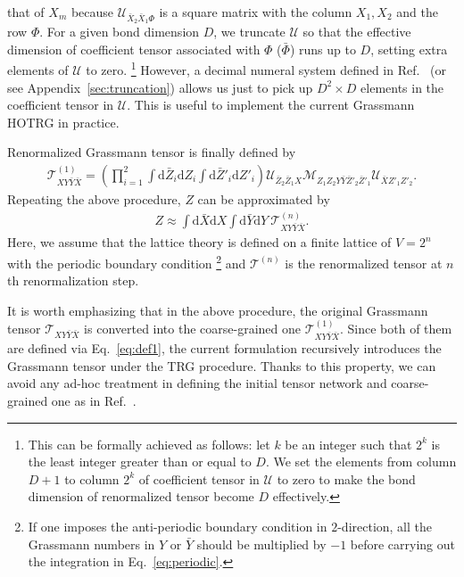 \documentclass[a4paper,11pt]{article}
\newcommand{\diff}{\mathrm{d}}
\begin{document}
that of $X_m$ because $\mathcal{U}_{\bar X_2\bar X_1\Phi}$ is a square matrix with the column $X_1,X_2$
and the row $\Phi$. 
For a given bond dimension $D$, we truncate $\mathcal{U}$  so that the effective dimension of coefficient tensor associated with $\Phi$ ($\bar \Phi$) runs up to $D$, setting extra elements of $\mathcal{U}$ to zero. 
\footnote{
This can be formally achieved as follows: 
let $k$ be an integer such that $2^{k}$ is the least integer greater than 
or equal to $D$.  
We set the elements from column $D+1$ to column $2^{k}$ of coefficient tensor in $\mathcal{U}$  to zero 
to make the bond dimension of renormalized tensor become $D$ effectively.
}
However, a decimal numeral system defined in
 Ref.~\cite{Kadoh} (or see Appendix~\ref{sec:truncation}) allows us just 
to pick up $D^{2}\times D$ elements in the coefficient tensor in $\mathcal{U}$. 
This is useful to implement the current Grassmann HOTRG in practice. 


Renormalized Grassmann tensor is finally defined by 
\begin{align}
	\mathcal{T}^{(1)}_{X Y\bar{Y}\bar{X}}=\left(\prod_{i=1}^{2}
	\int\diff\bar{Z}_{i} \diff{Z_{i}}  
       \int\diff\bar{Z}'_{i}\diff{Z'_{i}} 
       \right)
\mathcal{U}_{\bar{Z}_{2}\bar{Z}_{1}X}
\mathcal{M}_{Z_{1}Z_{2}Y\bar{Y}\bar{Z}'_{2}\bar{Z}'_{1}}\mathcal{U}_{\bar{X}Z'_{1}Z'_{2}}.
\end{align}
Repeating the above procedure, $Z$ can be approximated by 
\begin{align}
\label{eq:periodic}
	Z \approx \int\diff\bar{X}\diff X
	\int\diff\bar{Y}\diff Y \ 
	\mathcal{T}^{(n)}_{X Y\bar{Y}\bar{X}}.
\end{align}
Here, we assume that the lattice theory is defined on a finite lattice of $V=2^n$ with 
the periodic boundary condition \footnote{If one imposes the anti-periodic boundary condition in $2$-direction, all the Grassmann numbers in $Y$ or $\bar{Y}$ should be multiplied by $-1$ before carrying out the integration in Eq.~\eqref{eq:periodic}.} 
and $\mathcal{T}^{(n)}$ is the renormalized tensor at $n$th renormalization step.



It is worth emphasizing that in the above procedure, the original Grassmann tensor $\mathcal{T}_{XY\bar{Y}\bar{X}}$ is converted into the coarse-grained one 
$\mathcal{T}^{(1)}_{XY\bar{Y}\bar{X}}$. Since both of them are defined via Eq.~\eqref{eq:def1}, the current formulation recursively introduces the Grassmann tensor under the TRG procedure. Thanks to this property, we can avoid any ad-hoc treatment in defining the initial tensor network and coarse-grained one as in Ref.~\cite{Sakai:2017jwp}.
\end{document}
